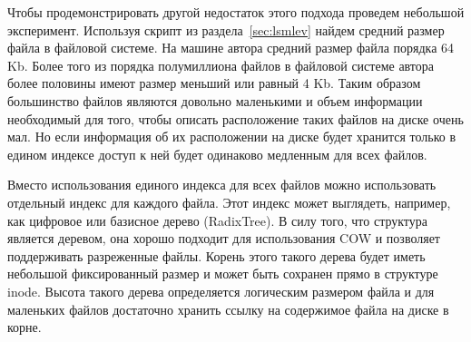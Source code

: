 Чтобы продемонстрировать другой недостаток этого подхода проведем небольшой
эксперимент. Используя скрипт из раздела~\ref{sec:lsmlev} найдем средний размер
файла в файловой системе. На машине автора средний размер файла порядка 64 Kb.
Более того из порядка полумиллиона файлов в файловой системе автора более
половины имеют размер меньший или равный 4 Kb. Таким образом большинство файлов
являются довольно маленькими и объем информации необходимый для того, чтобы
описать расположение таких файлов на диске очень мал. Но если информация об их
расположении на диске будет хранится только в едином индексе доступ к ней будет
одинаково медленным для всех файлов.

Вместо использования единого индекса для всех файлов можно использовать
отдельный индекс для каждого файла. Этот индекс может выглядеть, например, как
цифровое или базисное дерево (RadixTree). В силу того, что структура является
деревом, она хорошо подходит для использования COW и позволяет поддерживать
разреженные файлы. Корень этого такого дерева будет иметь небольшой
фиксированный размер и может быть сохранен прямо в структуре inode. Высота
такого дерева определяется логическим размером файла и для маленьких файлов
достаточно хранить ссылку на содержимое файла на диске в корне.
